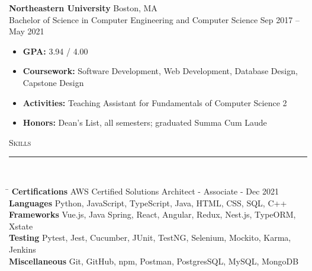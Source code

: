 \documentclass[11pt]{article}
\begin{document}
\begin{raggedright}
	\textbf{\large Northeastern University} \hfill Boston, MA \\
	Bachelor of Science in Computer Engineering and Computer Science \hfill Sep 2017 -- May 2021 \\
	\begin{itemize}
		\item \textbf{GPA:} 3.94 / 4.00
		\item \textbf{Coursework:} Software Development, Web Development, Database Design, Capstone Design
		\item \textbf{Activities:} Teaching Assistant for Fundamentals of Computer Science 2 \\
		\item \textbf{Honors:} Dean's List, all semesters; graduated Summa Cum Laude
	\end{itemize}
	\vspace{0.2in}
	
	
	\textsc{\Large Skills} \\
	\vspace{-0.1in}
	\rule{\textwidth}{0.4pt} \\
	\vspace{0.05in}

	\begin{tabbing}
		\hspace*{4cm}\= \kill
		\textbf{Certifications} \> AWS Certified Solutions Architect - Associate - Dec 2021 \\
		\textbf{Languages}  \> Python, JavaScript, TypeScript, Java, HTML, CSS, SQL, C++ \\
		\textbf{Frameworks} \> Vue.js, Java Spring, React, Angular, Redux, Nest.js, TypeORM, Xstate \\
		\textbf{Testing} \> Pytest, Jest, Cucumber, JUnit, TestNG, Selenium, Mockito, Karma, Jenkins \\
		\textbf{Miscellaneous} \> Git, GitHub, npm, Postman, PostgresSQL, MySQL, MongoDB \\
	\end{tabbing}
		
\end{raggedright}	
\end{document}
